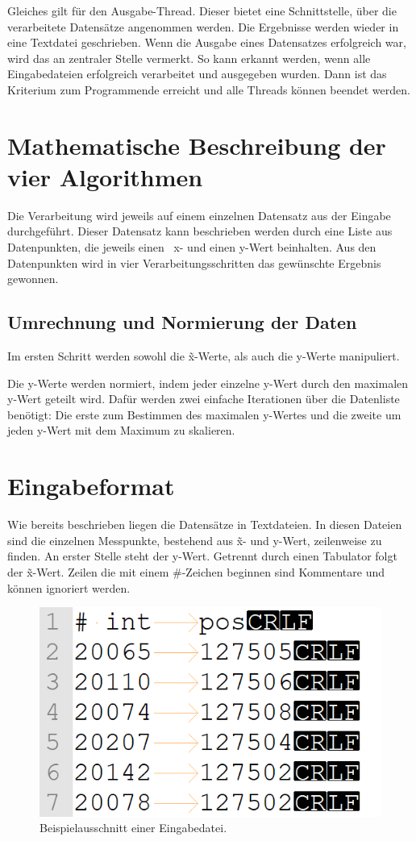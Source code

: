 Gleiches gilt für den Ausgabe-Thread.
Dieser bietet eine Schnittstelle, über die verarbeitete Datensätze angenommen werden.
Die Ergebnisse werden wieder in eine Textdatei geschrieben.
Wenn die Ausgabe eines Datensatzes erfolgreich war, wird das an zentraler Stelle vermerkt.
So kann erkannt werden, wenn alle Eingabedateien erfolgreich verarbeitet und ausgegeben wurden.
Dann ist das Kriterium zum Programmende erreicht und alle Threads können beendet werden.

\section{Mathematische Beschreibung der vier Algorithmen}\label{sec:mat-beschreibung}
Die Verarbeitung wird jeweils auf einem einzelnen Datensatz aus der Eingabe durchgeführt.
Dieser Datensatz kann beschrieben werden durch eine Liste aus Datenpunkten, die jeweils einen ~x- und einen y-Wert beinhalten.
Aus den Datenpunkten wird in vier Verarbeitungsschritten das gewünschte Ergebnis gewonnen.

\subsection{Umrechnung und Normierung der Daten}\label{subsec:umrechnung-und-normierung}
Im ersten Schritt werden sowohl die \~x-Werte, als auch die y-Werte manipuliert.

Die y-Werte werden normiert, indem jeder einzelne y-Wert durch den maximalen y-Wert geteilt wird.
Dafür werden zwei einfache Iterationen über die Datenliste benötigt:
Die erste zum Bestimmen des maximalen y-Wertes und die zweite um jeden y-Wert mit dem Maximum zu skalieren.



\section{Eingabeformat}\label{sec:eingabe-format}
Wie bereits beschrieben liegen die Datensätze in Textdateien.
In diesen Dateien sind die einzelnen Messpunkte, bestehend aus \~x- und y-Wert, zeilenweise zu finden.
An erster Stelle steht der y-Wert.
Getrennt durch einen Tabulator folgt der \~x-Wert.
Zeilen die mit einem \#-Zeichen beginnen sind Kommentare und können ignoriert werden.
\begin{figure}[htb]
    \centering
    \includegraphics[width=0.5\linewidth]{images/eingabeDat_bsp}
    \caption{
        Beispielausschnitt einer Eingabedatei.
    }
    \label{fig:eingabe_dat_beispiel}
\end{figure}


